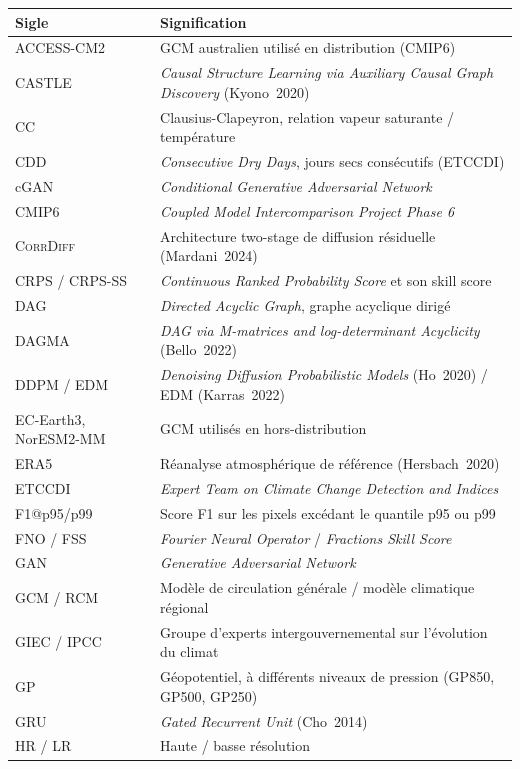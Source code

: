 \documentclass[14pt,a4paper,openany]{extreport}
\theoremstyle{definition}
\newcommand{\CorrDiff}{\textsc{CorrDiff}}
\begin{document}
\begin{longtable}{p{3cm} p{11.5cm}}
\toprule
\textbf{Sigle} & \textbf{Signification} \\
\midrule
\endhead

ACCESS-CM2 & GCM australien utilisé en distribution (CMIP6) \\
CASTLE & \emph{Causal Structure Learning via Auxiliary Causal Graph Discovery} (Kyono~2020) \\
CC & Clausius-Clapeyron, relation vapeur saturante / température \\
CDD & \emph{Consecutive Dry Days}, jours secs consécutifs (ETCCDI) \\
cGAN & \emph{Conditional Generative Adversarial Network} \\
CMIP6 & \emph{Coupled Model Intercomparison Project Phase 6} \\
\CorrDiff{} & Architecture two-stage de diffusion résiduelle (Mardani~2024) \\
CRPS / CRPS-SS & \emph{Continuous Ranked Probability Score} et son skill score \\
DAG & \emph{Directed Acyclic Graph}, graphe acyclique dirigé \\
DAGMA & \emph{DAG via M-matrices and log-determinant Acyclicity} (Bello~2022) \\
DDPM / EDM & \emph{Denoising Diffusion Probabilistic Models} (Ho~2020) / EDM (Karras~2022) \\
EC-Earth3, NorESM2-MM & GCM utilisés en hors-distribution \\
ERA5 & Réanalyse atmosphérique de référence (Hersbach~2020) \\
ETCCDI & \emph{Expert Team on Climate Change Detection and Indices} \\
F1@p95/p99 & Score F1 sur les pixels excédant le quantile p95 ou p99 \\
FNO / FSS & \emph{Fourier Neural Operator} / \emph{Fractions Skill Score} \\
GAN & \emph{Generative Adversarial Network} \\
GCM / RCM & Modèle de circulation générale / modèle climatique régional \\
GIEC / IPCC & Groupe d'experts intergouvernemental sur l'évolution du climat \\
GP & Géopotentiel, à différents niveaux de pression (GP850, GP500, GP250) \\
GRU & \emph{Gated Recurrent Unit} (Cho~2014) \\
HR / LR & Haute / basse résolution \\

\end{longtable}
\end{document}
